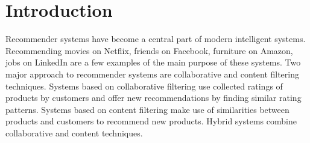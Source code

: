 \documentclass{article}
\begin{document}
\section{Introduction}


Recommender systems have become a central part of modern intelligent systems. Recommending movies on Netflix, friends on Facebook, furniture on Amazon, jobs on LinkedIn are a few examples of the main purpose of these systems. 
Two major approach to recommender systems are collaborative \cite{pro:BreeseHeckermanKadie98CollFilt} and content \cite{art:PazzaniBillsus07ContFilt} filtering techniques. Systems based on collaborative filtering use collected ratings of products by customers and offer new recommendations by finding similar rating patterns. Systems based on content filtering make use of similarities between products and customers to recommend new products. Hybrid systems combine collaborative and content techniques. 
\end{document}
